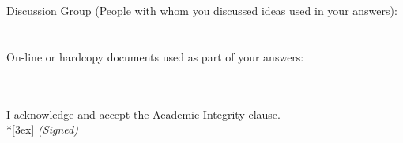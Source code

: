 \documentclass[11pt]{article}
\begin{document}
\vfill
\vfill

Discussion Group (People with whom you discussed ideas used in your answers): \\\\\\
On-line or hardcopy documents used as part of your answers: \\\\\\
\vfill

\vfill

I acknowledge and accept the Academic Integrity clause.\\*[3ex]
\bigskip
\textit{(Signed)}\hrulefill

\vfill
\vfill
\end{document}
